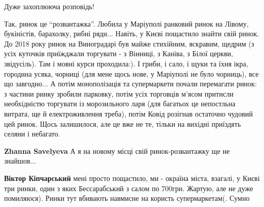 
 
 
 
 

\qqSecCmt


Дуже захоплююча розповідь!


Так, ринок це \enquote{розвантажка}. Любила у Маріуполі ранковий ринок на Лівому,
букіністів, барахолку, рибні ряди... Навіть, у Києві пощастило знайти свій
ринок. До 2018 року ринок на Виноградарі був майже стихійним, яскравим, щедрим
(з усіх куточків приїжджали торгувати - з Вінниці, з Каніва, з Білої церкви,
звідусіль). Там і мовні курси проходила:). І гриби, і сало, і щуки та їхня
ікра, городина усяка, чорниці (для мене щось нове, у Маріуполі не було
чорниць), все що завгодно... А потім монополізація та супермаркети почали
перемагати ринок: з частини ринку зробили парковку, потім усіх торговців м'ясом
притисли необхідністю торгувати із морозильного ларя (для багатьох це
непостльна витрата, ще й електроживлення треба), потім Ковід розігнав остаточно
чудовий цей ринок. Щось залишилося, але це вже не те, тільки на вихідні
приїздять селяни і небагато.

\begin{itemize} %
\textbf{Zhanna Savelyeva} А я на новому місці свій ринок-розвантажку ще не знайшов...

\textbf{Віктор Кіпчарський} мені просто пощастило, ми - окраїна міста, взагалі, у Києві три ринки, один з яких Бессарабський з салом по 700грн. Жартую, але не дуже помиляюся). Ринки тут вбивають навмисне на користь супермаркетам(. Сумно
\end{itemize} %


